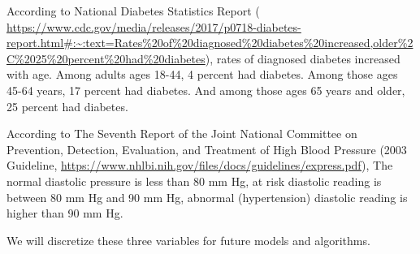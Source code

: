 \documentclass[
]{book}
\newenvironment{Shaded}{\begin{snugshade}}{\end{snugshade}}
\newcommand{\DecValTok}[1]{\textcolor[rgb]{0.00,0.00,0.81}{#1}}
\newcommand{\FunctionTok}[1]{\textcolor[rgb]{0.13,0.29,0.53}{\textbf{#1}}}
\newcommand{\NormalTok}[1]{#1}
\newcommand{\OtherTok}[1]{\textcolor[rgb]{0.56,0.35,0.01}{#1}}
\newcommand{\SpecialCharTok}[1]{\textcolor[rgb]{0.81,0.36,0.00}{\textbf{#1}}}
\newcommand{\StringTok}[1]{\textcolor[rgb]{0.31,0.60,0.02}{#1}}
\begin{document}
According to National Diabetes Statistics Report (
\url{https://www.cdc.gov/media/releases/2017/p0718-diabetes-report.html\#:~:text=Rates\%20of\%20diagnosed\%20diabetes\%20increased,older\%2C\%2025\%20percent\%20had\%20diabetes}), rates of diagnosed diabetes increased with age. Among adults ages 18-44, 4 percent had diabetes. Among those ages 45-64 years, 17 percent had diabetes. And among those ages 65 years and older, 25 percent had diabetes.

According to The Seventh Report of the Joint National Committee on Prevention, Detection, Evaluation, and Treatment of High Blood Pressure (2003 Guideline, \url{https://www.nhlbi.nih.gov/files/docs/guidelines/express.pdf}), The normal diastolic pressure is less than 80 mm Hg, at risk diastolic reading is between 80 mm Hg and 90 mm Hg, abnormal (hypertension) diastolic reading is higher than 90 mm Hg.

We will discretize these three variables for future models and algorithms.

\begin{Shaded}
\end{Shaded}
\end{document}
